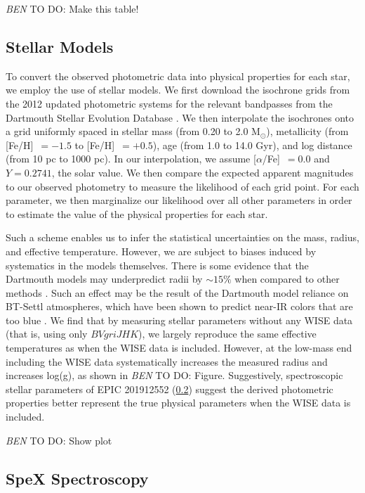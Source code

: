 \documentclass{emulateapj}
\newcommand{\msun}{{M$_\odot$}}
\newcommand{\logg}{{log(g)}}
\newcommand{\feh}{{[Fe/H]}~}
\newcommand{\afe}{{[$\alpha$/Fe]}~}
\newcommand{\todo}[3]{{\color{#2} \emph{#1} TO DO: #3}}
\newcommand{\btmtodo}[1]{\todo{BEN}{red}{#1}}
\begin{document}
\btmtodo{Make this table!}

\subsection{Stellar Models}
To convert the observed photometric data into physical properties for each
star, we employ the use of stellar models. 
We first download the isochrone grids from the 2012 updated photometric
systems for the relevant bandpasses from the Dartmouth Stellar Evolution
Database \citep{Dotter08}. 
We then interpolate the isochrones onto a grid uniformly spaced in
stellar mass (from 0.20 to 2.0 \msun), metallicity (from \feh$=-1.5$ to 
\feh$=+0.5$), age (from 1.0 to 14.0 Gyr), and log distance (from 10 pc to 
1000 pc). 
In our interpolation, we assume \afe$=0.0$ and $Y=0.2741$, the solar value.
We then compare the expected apparent magnitudes to our observed photometry
to measure the likelihood of each grid point.
For each parameter, we then marginalize our likelihood over all other 
parameters in order to estimate the value of the physical properties
for each star.

Such a scheme enables us to infer the statistical uncertainties on the
mass, radius, and effective temperature.
However, we are subject to biases induced by systematics in the models themselves.
There is some evidence that the Dartmouth models may underpredict 
radii by $\sim 15\%$ when compared to other methods \citep{Newton15,
Montet15}. 
Such an effect may be the result of the Dartmouth model reliance on BT-Settl
atmospheres, which have been shown to predict near-IR colors that are too blue
\citep{Thompson14}.
We find that by measuring stellar parameters without any WISE data (that is, using
only $BVgriJHK$), we largely reproduce the same effective temperatures as when
the WISE data is included. 
However, at the low-mass end including the WISE data systematically increases the 
measured radius and increases \logg, as shown in \btmtodo{Figure}.
Suggestively, spectroscopic stellar parameters of EPIC 201912552 
(\textsection\ref{Spexobs}) suggest the derived photometric properties better 
represent the true physical parameters when the WISE data is included. 


\btmtodo{Show plot}



\subsection{SpeX Spectroscopy}
\label{Spexobs}
\end{document}
